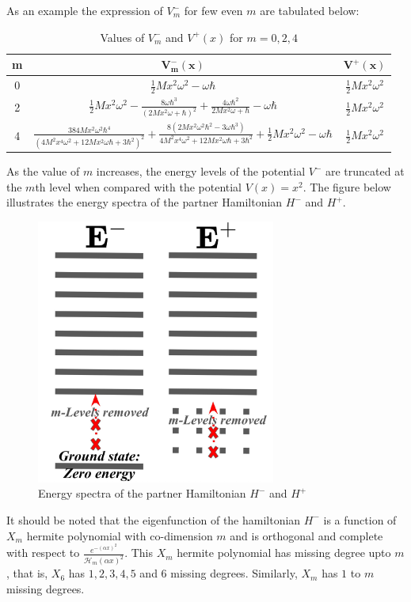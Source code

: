 \documentclass[a4paper, 12pt]{article}
\begin{document}
As an example the expression of \(V^-_m\) for few even $m$ are tabulated below:
\begin{table}[h]
\centering
\begin{tabular}{|c|c|c|}
\hline
\textbf{m} & $\mathbf{V^-_m(x)}$ & $\mathbf{V^+(x)}$ \\\hline
0 & $\frac{1}{2} M x^2 \omega ^2-\omega  \hbar$ & $\frac{1}{2} M x^2 \omega ^2$ \\
2 & $\frac{1}{2} M x^2 \omega ^2-\frac{8 \omega  \hbar ^3}{\left(2 M x^2 \omega +\hbar \right)^2}+\frac{4 \omega  \hbar ^2}{2 M x^2 \omega +\hbar }-\omega  \hbar$ & $\frac{1}{2} M x^2 \omega ^2$ \\
4 & $\frac{384 M x^2 \omega ^2 \hbar ^4}{\left(4 M^2 x^4 \omega ^2+12 M x^2 \omega  \hbar +3 \hbar ^2\right)^2}+\frac{8 \left(2 M x^2 \omega ^2 \hbar ^2-3 \omega  \hbar ^3\right)}{4 M^2 x^4 \omega ^2+12 M x^2 \omega  \hbar +3 \hbar ^2}+\frac{1}{2} M x^2 \omega ^2-\omega  \hbar$ & $\frac{1}{2} M x^2 \omega ^2$ \\
\hline
\end{tabular}
\caption{Values of $V^-_m$ and $V^+(x)$ for $m=0, 2, 4$}
\end{table}
As the value of \(m\) increases, the energy levels of the potential \(V^-\) are truncated at the \(m\)th level when compared with the potential \(V(x)=x^2\). The figure below illustrates the energy spectra of the partner Hamiltonian \(H^-\) and \(H^+\).

\begin{figure}[h]
    \centering
    \includegraphics[height=0.55\textwidth,width=0.7\textwidth]{IMG/REHO-spectra.jpeg}
    \caption{Energy spectra of the partner Hamiltonian \(H^-\) and \(H^+\)}
\end{figure}
It should be noted that the eigenfunction of the hamiltonian \(H^-\) is a function of $X_m$ hermite polynomial with co-dimension $m$ and is orthogonal and complete with respect to $\frac{e^{-(\alpha x)^2}}{\mathcal{H}_m(\alpha x)^2}$. This $X_m$ hermite polynomial has missing degree upto $m$, that is, $X_6$ has $1, 2, 3, 4, 5$ and $6$ missing degrees. Similarly, $X_m$ has $1$ to $m$ missing degrees.




%
%
\end{document}
